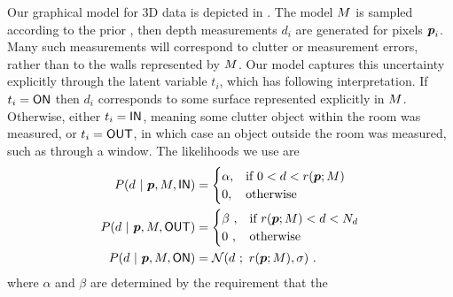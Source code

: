Our graphical model for 3D data is depicted in . The
model $M$ is sampled according to the prior ,
then depth measurements $d_i$ are generated for pixels
$\boldsymbol{p}_i$. Many such measurements will correspond to clutter or
measurement errors, rather than to the walls represented by
$M$. Our model captures this uncertainty explicitly through
the latent variable $t_i$, which has following interpretation. If
$t_i=\textsf{ON}$ then $d_i$ corresponds to some surface represented
explicitly in $M$. Otherwise, either $t_i=\textsf{IN}$, meaning some
clutter object within the room was measured, or $t_i=\textsf{OUT}$, in which
case an object outside the room was measured, such as through a
window. The likelihoods we use are
\begin{align}
  \label{eq:x-inside}
  P(d~|~\boldsymbol{p},M,\textsf{IN}) &=
  \begin{cases}
    \alpha, & \mbox{if } 0 < d < r(\boldsymbol{p};M) \\
    0, & \mbox{otherwise} \\
  \end{cases} \\
  \label{eq:x-outside}
  P(d~|~\boldsymbol{p},M,\textsf{OUT}) &=
  \begin{cases}
    \beta~, & \mbox{if } r(\boldsymbol{p};M) < d < N_d \\
    0~, & \mbox{otherwise} \\
  \end{cases} \\
  P(d ~|~ \boldsymbol{p},M,\textsf{ON}) &=
  \mathcal{N}(d~;~r(\boldsymbol{p};M),\sigma) ~.
\end{align}
where $\alpha$ and $\beta$ are determined by the requirement that the
